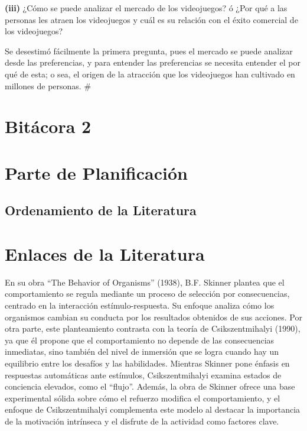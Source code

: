 \documentclass[
  letterpaper,
  DIV=11,
  numbers=noendperiod]{scrreprt}
\begin{document}
\textbf{(iii)} ¿Cómo se puede analizar el mercado de los videojuegos? ó
¿Por qué a las personas les atraen los videojuegos y cuál es su relación
con el éxito comercial de los videojuegos?

Se desestimó fácilmente la primera pregunta, pues el mercado se puede
analizar desde las preferencias, y para entender las preferencias se
necesita entender el por qué de esta; o sea, el origen de la atracción
que los videojuegos han cultivado en millones de personas. \#


\chapter{Bitácora 2}\label{bituxe1cora-2}


\chapter{Parte de Planificación}\label{parte-de-planificaciuxf3n}

\section{Ordenamiento de la
Literatura}\label{ordenamiento-de-la-literatura}


\chapter{Enlaces de la Literatura}\label{enlaces-de-la-literatura}

En su obra ``The Behavior of Organisms'' (1938), B.F. Skinner plantea
que el comportamiento se regula mediante un proceso de selección por
consecuencias, centrado en la interacción estímulo-respuesta. Su enfoque
analiza cómo los organismos cambian su conducta por los resultados
obtenidos de sus acciones. Por otra parte, este planteamiento contrasta
con la teoría de Csikszentmihalyi (1990), ya que él propone que el
comportamiento no depende de las consecuencias inmediatas, sino también
del nivel de inmersión que se logra cuando hay un equilibrio entre los
desafíos y las habilidades. Mientras Skinner pone énfasis en respuestas
automáticas ante estímulos, Csikszentmihalyi examina estados de
conciencia elevados, como el ``flujo''. Además, la obra de Skinner
ofrece una base experimental sólida sobre cómo el refuerzo modifica el
comportamiento, y el enfoque de Csikszentmihalyi complementa este modelo
al destacar la importancia de la motivación intrínseca y el disfrute de
la actividad como factores clave.
\end{document}
